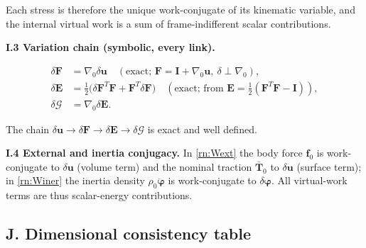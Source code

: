 \documentclass[11pt]{article}
\begin{document}
Each stress is therefore the unique work-conjugate of its kinematic variable, and the internal virtual work is a sum of frame-indifferent scalar contributions. \checkmark

\textbf{I.3 Variation chain (symbolic, every link).}

\begin{align}
\delta\mathbf{F} &= \nabla_{0}\delta\mathbf{u}
  \quad(\text{exact; } \mathbf{F}=\mathbf{I}+\nabla_{0}\mathbf{u},\ \delta\perp\nabla_{0}),
  \label{rn:chain_F}\\
\delta\mathbf{E}
  &= \tfrac12\bigl(\delta\mathbf{F}^{T}\mathbf{F}+\mathbf{F}^{T}\delta\mathbf{F}\bigr)
  \quad(\text{exact; from } \mathbf{E}=\tfrac12(\mathbf{F}^{T}\mathbf{F}-\mathbf{I})),
  \label{rn:chain_E}\\
\delta\bm{\mathcal{G}} &= \nabla_{0}\delta\mathbf{E}.
  \label{rn:chain_G}
\end{align}

The chain $\delta\mathbf{u}\to\delta\mathbf{F}\to\delta\mathbf{E}\to\delta\bm{\mathcal{G}}$ is exact and well defined.

\textbf{I.4 External and inertia conjugacy.} In \eqref{rn:Wext} the body force $\mathbf{f}_{0}$ is work-conjugate to $\delta\mathbf{u}$ (volume term) and the nominal traction $\bar{\mathbf{T}}_{0}$ to $\delta\mathbf{u}$ (surface term); in \eqref{rn:Winer} the inertia density $\rho_{0}\ddot{\boldsymbol{\varphi}}$ is work-conjugate to $\delta\boldsymbol{\varphi}$. All virtual-work terms are thus scalar-energy contributions. \checkmark

\subsection{J. Dimensional consistency table}
\end{document}

